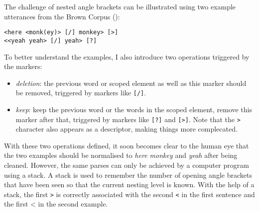 The challenge of nested angle brackets can be illustrated using two example utterances from the Brown Corpus (\cite{brown1973}):

\texttt{<here <monk(ey)> [/] monkey> [>]}\\  %
\texttt{<<yeah yeah> [/] yeah> [?]} %

To better understand the examples, I also introduce two operations triggered by the markers:
\begin{itemize}
	\item \emph{deletion}: the previous word or scoped element as well as this marker should be removed, triggered by markers like \texttt{[/]}.
	\item \emph{keep}: keep the previous word or the words in the scoped element, remove this marker after that, triggered by markers like \texttt{[?]} and \texttt{[>]}. Note that the \texttt{>} character also appears as a descriptor, making things more complecated.
\end{itemize}

With these two operations defined, it soon becomes clear to the human eye that the two examples should be normalised to \emph{here monkey} and \emph{yeah} after being cleaned. However, the same parses can only be achieved by a computer program using a stack. A stack is used to remember the number of opening angle brackets that have been seen so that the current nesting level is known. With the help of a stack, the first \texttt{>} is correctly associated with the second \texttt{<} in the first sentence and the first {<} in the second example.

\begin{algorithm}
  \SetAlgoLined\LinesNumberedHidden
  \DontPrintSemicolon
  \;
\end{algorithm}


